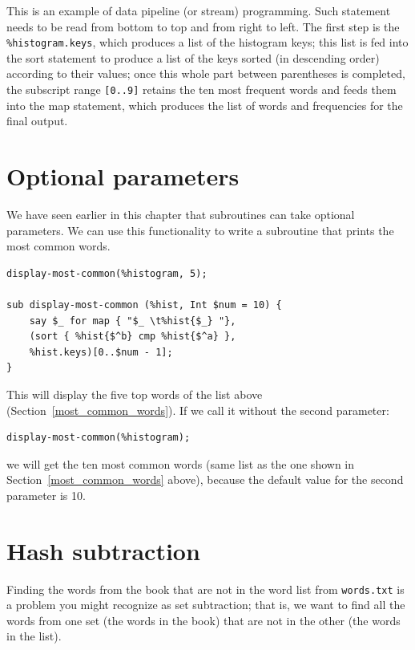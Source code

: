 This is an example of data pipeline (or stream) programming. Such statement 
needs to be read from bottom to top and from right to left. The 
first step is the \verb'%histogram.keys', which produces a list 
of the histogram keys; this list is fed into the sort statement 
to produce a list of the keys sorted (in descending order) according 
to their values; once this whole part between parentheses is 
completed, the subscript range \verb'[0..9]' retains the ten 
most frequent words and feeds them into the map statement, 
which produces the list of words and frequencies for the final 
output.


\section{Optional parameters}

We have seen earlier in this chapter that subroutines can 
take optional parameters. We can use this functionality to 
write a subroutine that prints the most common words.

\begin{verbatim}
display-most-common(%histogram, 5);

sub display-most-common (%hist, Int $num = 10) {
    say $_ for map { "$_ \t%hist{$_} "}, 
    (sort { %hist{$^b} cmp %hist{$^a} },
    %hist.keys)[0..$num - 1];
}
\end{verbatim}

This will display the five top words of the list above 
(Section~\ref{most_common_words}). If we call it without 
the second parameter:

\begin{verbatim}
display-most-common(%histogram);
\end{verbatim}

we will get the ten most common words (same list as the one 
shown in Section~\ref{most_common_words} above), because 
the default value for the second parameter is 10.


\section{Hash subtraction}
\label{hashsub}

Finding the words from the book that are not in the word list
from {\tt words.txt} is a problem you might recognize as set
subtraction; that is, we want to find all the words from one
set (the words in the book) that are not in the other (the
words in the list).

